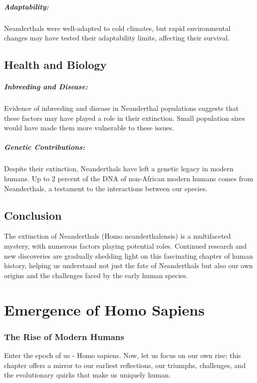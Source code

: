 \documentclass{book}
\begin{document}
\paragraph{Adaptability:}
Neanderthals were well-adapted to cold climates, but rapid environmental changes may have tested their adaptability limits, affecting their survival.

\section*{Health and Biology}

\paragraph{Inbreeding and Disease:}
Evidence of inbreeding and disease in Neanderthal populations suggests that these factors may have played a role in their extinction. Small population sizes would have made them more vulnerable to these issues.

\paragraph{Genetic Contributions:}
Despite their extinction, Neanderthals have left a genetic legacy in modern humans. Up to 2 percent of the DNA of non-African modern humans comes from Neanderthals, a testament to the interactions between our species.

\section*{Conclusion}

The extinction of Neanderthals (Homo neanderthalensis) is a multifaceted mystery, with numerous factors playing potential roles. Continued research and new discoveries are gradually shedding light on this fascinating chapter of human history, helping us understand not just the fate of Neanderthals but also our own origins and the challenges faced by the early human species.

\chapter{Emergence of Homo Sapiens}
\subsection*{The Rise of Modern Humans}
Enter the epoch of us - Homo sapiens. Now, let us focus on our own rise; this chapter offers a mirror to our earliest reflections, our triumphs, challenges, and the evolutionary quirks that make us uniquely human.
\end{document}
